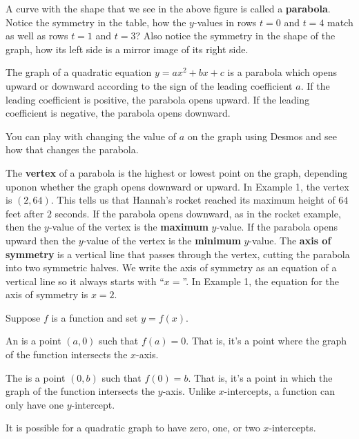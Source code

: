 \documentclass{ximera}
\begin{document}
 A curve with the shape that we see in the above figure
      is called a \textbf{parabola}.
      Notice the symmetry in the table,
      how the $y$-values in rows $t=0$ and $t=4$ match as well as rows $t=1$ and $t=3$? 
      Also notice the symmetry in the shape of the graph,
      how its left side is a mirror image of its right side.

  The graph of a quadratic equation $y=ax^2+bx+c$ is a parabola which opens upward or downward
        according to the sign of the leading coefficient $a$.
        If the leading coefficient is positive,
        the parabola opens upward.
        If the leading coefficient is negative,
        the parabola opens downward.

You can play with changing the value of $a$ on the graph using Desmos and see how that changes the parabola.  

\begin{center}  
\end{center}

 The \textbf{vertex}
      of a parabola is the highest or lowest point on the graph,
      depending uponon whether the graph opens downward or upward.
      In Example 1, the vertex is $(2,64)$.
      This tells us that Hannah's rocket reached its maximum height of $64$ feet after $2$ seconds.
      If the parabola opens downward, as in the rocket example,
      then the $y$-value of the vertex is the \textbf{maximum} $y$-value.
      If the parabola opens upward then the $y$-value of the vertex is the \textbf{minimum} $y$-value.
      The \textbf{axis of symmetry}
      is a vertical line that passes through the vertex, cutting the parabola into two symmetric halves.
      We write the axis of symmetry as an equation of a vertical line so it always starts with ``$x=$''.
      In Example 1, the equation for the axis of symmetry is $x=2$.
  
\begin{definition}[Intercepts]
	Suppose $f$ is a function and set $y=f(x)$.

	An  is a point $(a,0)$ such that $f(a) = 0$. That is, it's a 
	point where the graph of the function intersects the $x$-axis. 

	The  is a point $(0,b)$ such that $f(0) = b$. That is, it's a 
	point in which the graph of the function intersects the $y$-axis. Unlike 
	$x$-intercepts, a function can only have one $y$-intercept.
\end{definition}
      It is possible for a quadratic graph to have zero, one, or two $x$-intercepts.
\end{document}
